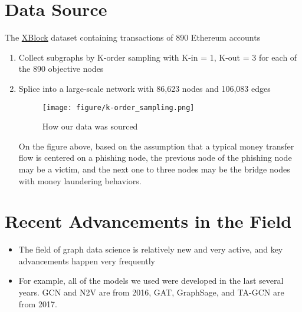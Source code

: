 \documentclass[article,36pt,extrafontsizes,oneside,openany,oldfontcommands]{memoir}
\begin{document}
\begin{adjmulticols*}{3}{0.5in}{0.5in}
\section{Data Source}
\begin{adjustwidth}{0.1in}{0in}
The \href{http://xblock.pro/#/dataset/6}{XBlock} dataset containing transactions of 890 Ethereum accounts
\begin{enumerate}[topsep=0pt,itemsep=0ex,partopsep=0ex,parsep=0ex]
\item Collect subgraphs by K-order sampling with K-in = 1, K-out = 3 for each of the 890 objective nodes 
\item Splice into a large-scale network with 86,623 nodes and 106,083 edges
\begin{figure}
	\centering
	\texttt{[image: figure/k-order\_sampling.png]}
	\caption{How our data was sourced}
\end{figure}
\linebreak
On the figure above, based on the assumption that a typical money transfer flow is centered on a phishing node, the previous node of the phishing node may be a victim, and the next one to three nodes may be the bridge nodes with money laundering behaviors.

\end{enumerate}
\end{adjustwidth}
\section{Recent Advancements in the Field}
\begin{adjustwidth}{0.1in}{0in}
\begin{itemize}[topsep=0pt,itemsep=0ex,partopsep=0ex,parsep=0ex]
\item The field of graph data science is relatively new and very active, and key advancements happen very frequently
\item For example, all of the models we used were developed in the last several years. GCN and N2V are from 2016, GAT, GraphSage, and TA-GCN are from 2017.
\end{itemize} 
\end{adjustwidth}



\end{adjmulticols*}
\end{document}
